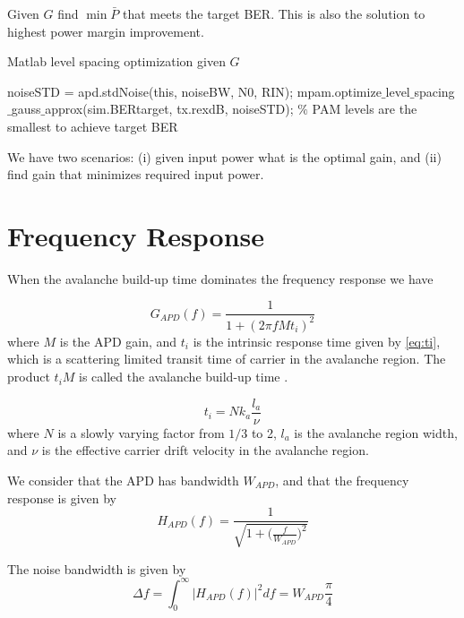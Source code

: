 \documentclass[a4paper]{article}
\begin{document}
Given $G$ find $\min\bar{P}$ that meets the target BER. This is also the solution to highest power margin improvement.

\begin{algorithm}
\caption{Matlab level spacing optimization given $G$}
\label{level-space-opt-given-G}
\begin{algorithmic}[1]
\State noiseSTD = apd.stdNoise(this, noiseBW, N0, RIN);
\State mpam.optimize$\_$level$\_$spacing$\_$gauss$\_$approx(sim.BERtarget, tx.rexdB, noiseSTD); $\%$ PAM levels are the smallest to achieve target BER
\end{algorithmic}
\end{algorithm}

We have two scenarios: (i) given input power what is the optimal gain, and (ii) find gain that minimizes required input power.

\section{Frequency Response}

When the avalanche build-up time dominates the frequency response we have \cite{}

\begin{equation}
G_{APD}(f) = \frac{1}{1 + (2\pi fMt_i)^2}
\end{equation}
where $M$ is the APD gain, and $t_i$ is the intrinsic response time given by \eqref{eq:ti}, which is a scattering limited transit time of carrier in the avalanche region. The product $t_iM$ is called the avalanche build-up time \cite{frequency-reponse-InP-InGaAs}.

\begin{equation}
t_i = Nk_a\frac{l_a}{\nu}
\end{equation}
where $N$ is a slowly varying factor from $1/3$ to 2, $l_a$ is the avalanche region width, and $\nu$ is the effective carrier drift velocity in the avalanche region.

We consider that the APD has bandwidth $W_{APD}$, and that the frequency response is given by
\begin{equation}
H_{APD}(f) = \frac{1}{\sqrt{1 + \bigg(\frac{f}{W_{APD}}\bigg)^2}}
\end{equation}

The noise bandwidth is given by
\begin{equation}
\Delta f = \int_{0}^{\infty} |H_{APD}(f)|^2 df = W_{APD}\frac{\pi}{4}
\end{equation}
\end{document}
